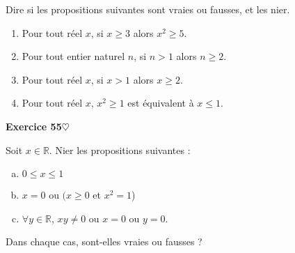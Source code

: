 ﻿\documentclass[11pt,a4paper]{amsart}
\theoremstyle{theorem}
\theoremstyle{definition}
\newcommand{\coeur}{$\heartsuit$}
\def\RR{{\mathbb R}}
\newcounter{qcounter}
\newcounter{qscounter}
\begin{document}
Dire si les propositions suivantes sont
vraies ou fausses, et les nier.

\begin{enumerate}
\item Pour tout réel $x$, si $x\geq 3$ alors $x^2\geq 5$.
\item Pour tout entier naturel $n$, si $n>1$ alors $n\geq 2$.
\item Pour tout réel $x$, si $x>1$ alors $x\geq 2$.
\item Pour tout réel $x$,  $x^2\geq 1$ est équivalent à $x\leq 1$.
\end{enumerate}

\setcounter{qcounter}{0} \setcounter{qscounter}{0}\textbf{Exercice 55}{\coeur}

Soit $x\in\RR$. Nier les propositions suivantes :

\begin{enumerate}[a)]
\item $0\leq x\leq 1$
\item $x=0$ ou $(x\geq 0$ et $x^2=1$)
\item $\forall y\in\RR$, $xy\neq 0$ ou $x=0$ ou $y=0$.
\end{enumerate}

Dans chaque cas, sont-elles vraies ou fausses ?

\setcounter{qcounter}{0} \setcounter{qscounter}{0}
\end{document}
